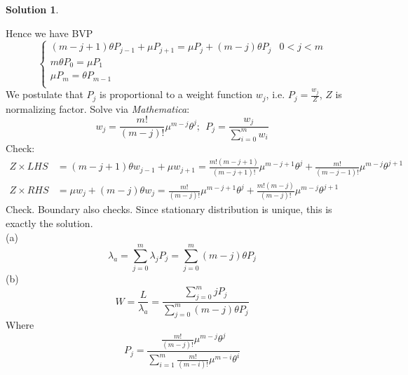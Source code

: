 \documentclass[a4paper, 10pt]{article}
\theoremstyle{definition}
\theoremstyle{hSol}
\newtheorem*{solution}{Solution}
\begin{document}
\begin{solution}
\begin{center}
\end{center}
Hence we have BVP
\begin{equation}
  \begin{cases}
    (m-j+1)\theta P_{j-1} + \mu P_{j+1} = \mu P_j+ (m-j)\theta P_j & 0<j<m \\
    m\theta P_{0} = \mu P_1 \\
    \mu P_{m} = \theta P_{m-1} \\
  \end{cases}
\end{equation}
We postulate that $P_j$ is proportional to a weight function $w_j$, i.e. $P_j=\frac{w_j}{Z}$, $Z$ is normalizing factor. Solve via \textit{Mathematica}: 
\begin{equation}
  w_j = \frac{m!}{(m-j)!}\mu^{m-j}\theta^j;~~P_j = \frac{w_j}{\sum_{i=0}^m w_i}
\end{equation}
Check: 
\begin{equation}
  \begin{split}
    Z\times LHS &= (m-j+1)\theta w_{j-1} + \mu w_{j+1} = \frac{m!(m-j+1)}{(m-j+1)!}\mu^{m-j+1}\theta^{j} + \frac{m!}{(m-j-1)!}\mu^{m-j}\theta^{j+1} \\
    Z\times RHS &= \mu w_j+ (m-j)\theta w_j = \frac{m!}{(m-j)!}\mu^{m-j+1}\theta^j + \frac{m!(m-j)}{(m-j)!}\mu^{m-j}\theta^{j+1}
  \end{split}
\end{equation}
Check. Boundary also checks. Since stationary distribution is unique, this is exactly the solution.\\
(a)
\begin{equation}
  \lambda_a = \sum_{j=0}^m \lambda_j P_j = \sum_{j=0}^m (m-j)\theta P_j
\end{equation}
(b)
\begin{equation}
  W = \frac{L}{\lambda_a} = \frac{\sum_{j=0}^m j P_j}{\sum_{j=0}^m (m-j)\theta P_j}
\end{equation}
Where 
$$
P_j = \frac{\frac{m!}{(m-j)!}\mu^{m-j}\theta^j}{\sum_{i=1}^m \frac{m!}{(m-i)!}\mu^{m-i}\theta^i}
$$
\end{solution}
\end{document}
